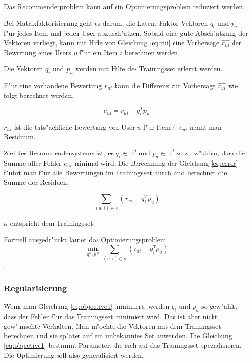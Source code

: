 \documentclass[a4paper, 12pt]{article}
\begin{document}
Das Recommenderproblem kann auf ein Optimierungsproblem reduziert werden.

Bei Matrixfaktorisierung geht es darum, die Latent Faktor Vektoren $q_i$ und $p_u$ f"ur jedes Item und jeden User abzusch"atzen. Sobald eine gute Absch"atzung der  Vektoren vorliegt, kann mit Hifle von Gleichung \ref{eq:rui} eine Vorhersage $ \hat{r_{ui}}$ der Bewertung eines Users $u$ f"ur ein Item $i$ berechnen werden. 

Die Vektoren $q_i$ und $p_u$ werden mit Hilfe des Trainingsset erlernt werden. 

F"ur eine vorhandene Bewertung $r_{ui}$ kann die Differenz zur Vorhersage $\hat{r_{ui}}$ wie folgt berechnet werden.

\begin{equation}
  \label{eq:error}
  e_{ui} = r_{ui} - q_i^T p_u
\end{equation}

$r_{ui}$ ist die tats"achliche Bewertung von User $u$ f"ur Item $i$. 
$e_{ui}$ nennt man Residuum.

Ziel des Recommendersystems ist, es $q_i \in \mathbb{R}^f$ und $p_u \in \mathbb{R}^f$ so zu w"ahlen, dass die Summe aller Fehler $e_{ui}$ minimal wird. Die Berechnung der Gleichung \ref{eq:error} f"uhrt man f"ur alle Bewertungen im Trainingsset durch und berechnet die Summe der Residuen.

\begin{equation}
\label{eq:errorsum}
  \sum_{(u,i) \in \kappa} (r_{ui} - q_i^T p_u)
\end{equation}

$\kappa$ entspricht dem Trainingsset.

Formell ausgedr"uckt lautet das Optimierungsproblem 
\begin{equation}
  \min_{q*,p*} \sum_{(u,i) \in \kappa} (r_{ui} - q_i^T p_u)
  \label{eq:objective1}
\end{equation}
.

\subsubsection{Regularisierung}
\label{sec:regularization}

Wenn man Gleichung \ref{eq:objective1} minimiert, werden $q_i$ und $p_u$ so gew"ahlt, dass der Fehler f"ur das Trainingsset minimiert wird. Das ist aber nicht gew"unschte Verhalten. Man m"ochte die Vektoren mit dem Trainingsset berechnen und sie sp"ater auf ein unbekanntes Set anwenden. Die Gleichung \ref{eq:objective1} bestimmt Parameter, die sich auf das Trainingsset spezialisieren. Die Optimierung soll also generalisiert werden.
\end{document}
